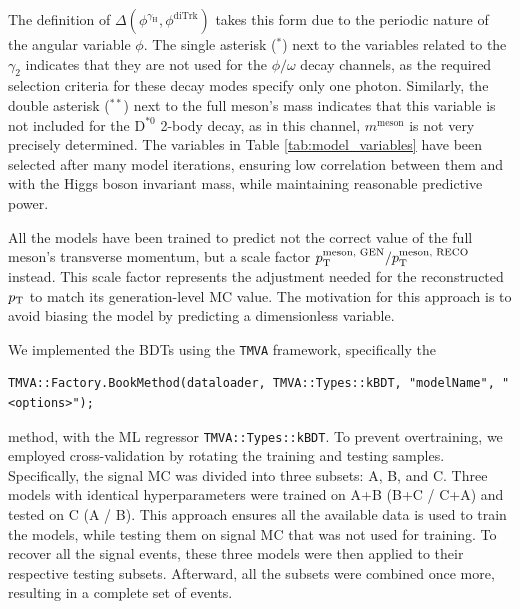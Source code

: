 The definition of $\Delta(\phi^{\gamma_{\text{H}}}, \phi^{\text{diTrk}})$ takes this form due to the periodic nature of the angular variable $\phi$. The single asterisk ($^{*}$) next to the variables related to the $\gamma_2$ indicates that they are not used for the $\phi/\omega$ decay channels, as the required selection criteria for these decay modes specify only one photon. Similarly, the double asterisk ($^{**}$) next to the full meson's mass indicates that this variable is not included for the $\text{D}^{*0}$ 2-body decay, as in this channel, $m^{\text{meson}}$ is not very precisely determined. The variables in Table \ref{tab:model_variables} have been selected after many model iterations, ensuring low correlation between them and with the Higgs boson invariant mass, while maintaining reasonable predictive power.

All the models have been trained to predict not the correct value of the full meson's transverse momentum, but a scale factor $p_\text{T}^{\text{meson, GEN}}/p_\text{T}^{\text{meson, RECO}}$ instead. This scale factor represents the adjustment needed for the reconstructed $p_\text{T}$ to match its generation-level MC value. The motivation for this approach is to avoid biasing the model by predicting a dimensionless variable.

We implemented the BDTs using the \verb+TMVA+ framework, specifically the
\begin{small}
\vspace*{-6pt}
\begin{verbatim}
TMVA::Factory.BookMethod(dataloader, TMVA::Types::kBDT, "modelName", "<options>");
\end{verbatim}
\vspace*{-6pt}
\end{small}
method, with the ML regressor \verb+TMVA::Types::kBDT+. To prevent overtraining, we employed cross-validation by rotating the training and testing samples. Specifically, the signal MC was divided into three subsets: A, B, and C. Three models with identical hyperparameters were trained on A+B (B+C / C+A) and tested on C (A / B). This approach ensures all the available data is used to train the models, while testing them on signal MC that was not used for training. To recover all the signal events, these three models were then applied to their respective testing subsets. Afterward, all the subsets were combined once more, resulting in a complete set of events.

